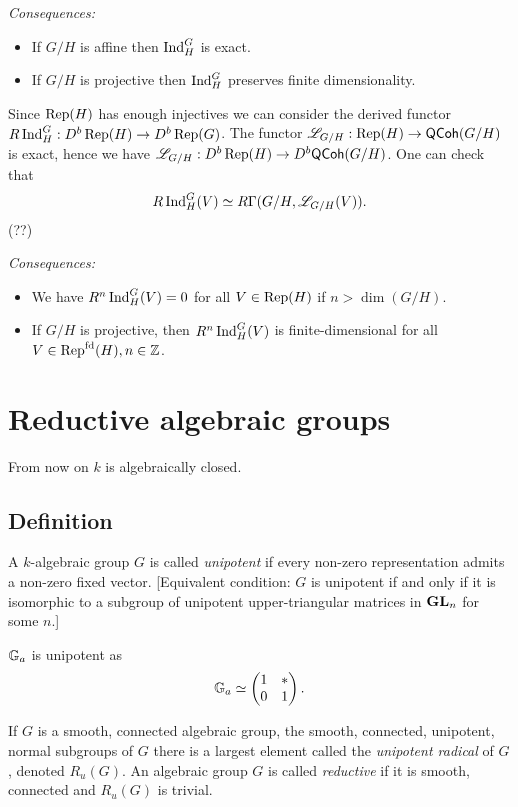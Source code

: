 \emph{Consequences:}
\begin{itemize}
	\item If $G /H$ is affine then $\operatorname{Ind}_{H}^{G}$ is exact.
	\item If $G /H$ is projective then $\operatorname{Ind}_{H}^{G}$ preserves finite dimensionality.
\end{itemize}

Since $\operatorname{Rep}(H)$ has enough injectives we can consider the derived functor $R\Ind_H^{G}:D^{b}\Rep(H)\to D^{b}\Rep(G)$. The functor $\CL_{G /H}:\Rep(H)\to \cat{QCoh}(G /H)$ is exact, hence we have $\CL_{G /H}:D^{b}\Rep(H)\to D^{b}\cat{QCoh}(G /H)$. One can check that
\[
R\operatorname{Ind}_H^{G}(V) \simeq R\Gamma(G /H, \mathscr{L}_{G /H}(V)).
\] 
(??)

\emph{Consequences:}
\begin{itemize}
	\item We have $R^{n}\operatorname{Ind}_H^{G}(V)=0$ for all $V\in \operatorname{Rep}(H)$ if $n>\dim(G /H)$.
	\item If $G /H$ is projective, then $R^{n}\operatorname{Ind}_H^{G}(V)$ is finite-dimensional for all $V\in \operatorname{Rep}^{\text{fd}}(H), n\in \mathbb Z$.
\end{itemize}

\section{Reductive algebraic groups}
From now on $k$ is algebraically closed.

\subsection{Definition}
A $k$-algebraic group $G$ is called \emph{unipotent} if every non-zero representation admits a non-zero fixed vector. [Equivalent condition: $G$ is unipotent if and only if it is isomorphic to a subgroup of unipotent upper-triangular matrices in $\mathbf{GL}_n$ for some $n$.]
\begin{example}
	$\mathbb{G}_a$ is unipotent as
	\[
		\mathbb{G}_a \simeq \begin{pmatrix} 1 & * \\ 0 & 1 \end{pmatrix} .
	\] 
\end{example}
If $G$ is a smooth, connected algebraic group, the smooth, connected, unipotent, normal subgroups of $G$ there is a largest element called the \emph{unipotent radical} of $G$, denoted $R_u(G)$. An algebraic group $G$ is called \emph{reductive} if it is smooth, connected and $R_u(G)$ is trivial. 


